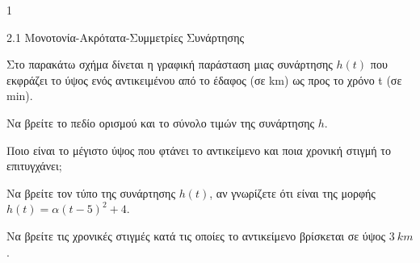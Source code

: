 \begin{ylh}{1}
\item 2.1 Μονοτονία-Ακρότατα-Συμμετρίες Συνάρτησης
\end{ylh}
Στο παρακάτω σχήμα δίνεται η γραφική παράσταση μιας συνάρτησης $h(t)$ που εκφράζει το ύψος ενός αντικειμένου από το έδαφος (σε km) ως προς το χρόνο t (σε min).
\begin{center}
\end{center}
\begin{alist}
\item Να βρείτε το πεδίο ορισμού και το σύνολο τιμών της συνάρτησης $h$.
\item Ποιο είναι το μέγιστο ύψος που φτάνει το αντικείμενο και ποια χρονική στιγμή το επιτυγχάνει;
\item Να βρείτε τον τύπο της συνάρτησης $h(t)$, αν γνωρίζετε ότι είναι της μορφής $h(t) = \alpha(t-5)^2 + 4$.
\item Να βρείτε τις χρονικές στιγμές κατά τις οποίες το αντικείμενο βρίσκεται σε ύψος $3\ km$.
\end{alist}

